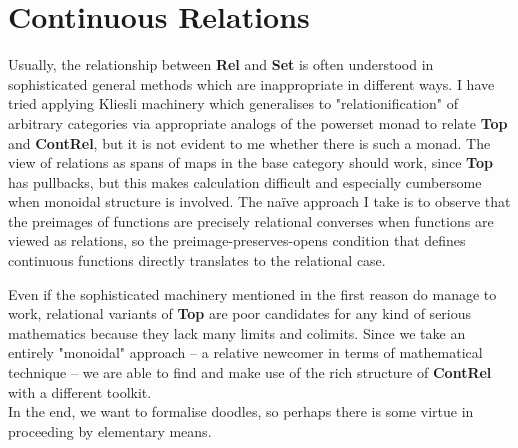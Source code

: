 \section{Continuous Relations}


 Usually, the relationship between \textbf{Rel} and \textbf{Set} is often understood in sophisticated general methods which are inappropriate in different ways. I have tried applying Kliesli machinery which generalises to "relationification" of arbitrary categories via appropriate analogs of the powerset monad to relate \textbf{Top} and \textbf{ContRel}, but it is not evident to me whether there is such a monad. The view of relations as spans of maps in the base category should work, since \textbf{Top} has pullbacks, but this makes calculation difficult and especially cumbersome when monoidal structure is involved. The na\"{i}ve approach I take is to observe that the preimages of functions are precisely relational converses when functions are viewed as relations, so the preimage-preserves-opens condition that defines continuous functions directly translates to the relational case.

 Even if the sophisticated machinery mentioned in the first reason do manage to work, relational variants of \textbf{Top} are poor candidates for any kind of serious mathematics because they lack many limits and colimits. Since we take an entirely "monoidal" approach -- a relative newcomer in terms of mathematical technique -- we are able to find and make use of the rich structure of \textbf{ContRel} with a different toolkit.\\

In the end, we want to formalise doodles, so perhaps there is some virtue in proceeding by elementary means.


